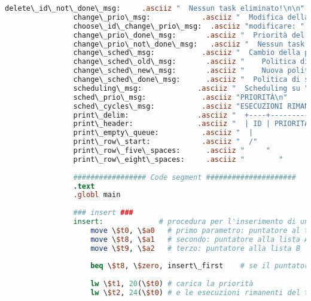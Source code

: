 \begin{center}
\begin{lstlisting}[language=mips, gobble=14, stepnumber=1]
                delete\_id\_not\_done\_msg:     .asciiz "  Nessun task eliminato!\n\n"
                change\_prio\_msg:            .asciiz "  Modifica della priorità di un task specifico.\n"
                choose\_id\_change\_prio\_msg:  .asciiz "modificare: "
                change\_prio\_done\_msg:       .asciiz "  Priorità del task correttamente modificata!\n\n"
                change\_prio\_not\_done\_msg:   .asciiz "  Nessun task modificato!\n\n"
                change\_sched\_msg:           .asciiz "  Cambio della politica di scheduling.\n"
                change\_sched\_old\_msg:       .asciiz "    Politica di scheduling attuale: su "
                change\_sched\_new\_msg:       .asciiz "    Nuova politica di scheduling: su "
                change\_sched\_done\_msg:      .asciiz "  Politica di scheduling correttamente cambiata!\n\n"
                scheduling\_msg:             .asciiz "  Scheduling su "
                sched\_prio\_msg:             .asciiz "PRIORITÀ\n"
                sched\_cycles\_msg:           .asciiz "ESECUZIONI RIMANENTI\n"
                print\_delim:                .asciiz "  +----+-----------+-----------+-------------------+\n"
                print\_header:               .asciiz "  | ID | PRIORITA' | NOME TASK | ESECUZ. RIMANENTI |\n"
                print\_empty\_queue:          .asciiz "  |                  Coda vuota!                   |\n"
                print\_row\_start:            .asciiz "  /"
                print\_row\_five\_spaces:      .asciiz "     "
                print\_row\_eight\_spaces:     .asciiz "        "
                
                ################# Code segment #####################
                .text
                .globl main
                
                ### insert ###
                insert:             # procedura per l'inserimento di un task nelle liste
                    move \$t0, \$a0   # primo parametro: puntatore al task da inserire
                    move \$t8, \$a1   # secondo: puntatore alla lista A
                    move \$t9, \$a2   # terzo: puntatore alla lista B
                    
                    beq \$t8, \$zero, insert\_first    # se il puntatore d'inizio è nullo (coda vuota), salta all'inserimento del primo task nella coda
                    
                    lw \$t1, 20(\$t0) # carica la priorità
                    lw \$t2, 24(\$t0) # e le esecuzioni rimanenti del task da inserire
                    

\end{lstlisting}
\end{center}
